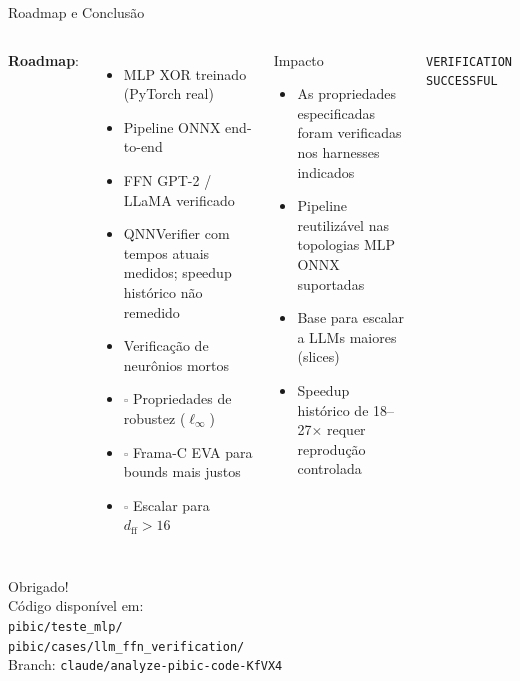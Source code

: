 \documentclass[aspectratio=169]{beamer}
\begin{document}
\begin{frame}{Roadmap e Conclusão}
  \begin{columns}
    \textbf{Roadmap}:
    \begin{itemize}
      \item \textcolor{okgreen}{\checkmark} MLP XOR treinado (PyTorch real)
      \item \textcolor{okgreen}{\checkmark} Pipeline ONNX end-to-end
      \item \textcolor{okgreen}{\checkmark} FFN GPT-2 / LLaMA verificado
      \item \textcolor{okgreen}{\checkmark} QNNVerifier com tempos atuais medidos; speedup histórico não remedido
      \item \textcolor{okgreen}{\checkmark} Verificação de neurônios mortos
      \item \textcolor{gray}{$\square$} Propriedades de robustez ($\ell_\infty$)
      \item \textcolor{gray}{$\square$} Frama-C EVA para bounds mais justos
      \item \textcolor{gray}{$\square$} Escalar para $d_\text{ff} > 16$
    \end{itemize}

    \begin{exampleblock}{Impacto}
      \begin{itemize}
        \item As propriedades especificadas foram verificadas nos harnesses indicados
        \item Pipeline reutilizável nas topologias MLP ONNX suportadas
        \item Base para escalar a LLMs maiores (slices)
        \item Speedup histórico de 18--27$\times$ requer reprodução controlada
      \end{itemize}
    \end{exampleblock}

    \vspace{0.5em}
    \begin{center}
      \Large\textcolor{esbmcblue}{\texttt{VERIFICATION SUCCESSFUL}}
    \end{center}
  \end{columns}
\end{frame}

\begin{frame}[plain]
  \begin{center}
    \vspace{2cm}
    {\Huge Obrigado!}\\[1.5em]
    \large
    Código disponível em:\\[0.5em]
    \texttt{pibic/teste\_mlp/}\\[0.2em]
    \texttt{pibic/cases/llm\_ffn\_verification/}\\[1.5em]
    \normalsize
    Branch: \texttt{claude/analyze-pibic-code-KfVX4}
  \end{center}
\end{frame}
\end{document}
